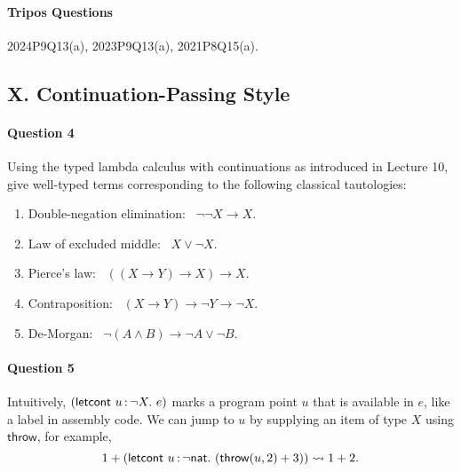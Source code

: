 \documentclass[11pt,a4paper,twoside]{article}
\begin{document}
\paragraph{Tripos Questions} 2024P9Q13(a), 2023P9Q13(a), 2021P8Q15(a).

\subsection*{X. Continuation-Passing Style}

\paragraph{Question 4} Using the typed lambda calculus with continuations as introduced in Lecture 10,
give well-typed terms corresponding to the following classical tautologies:

\begin{enumerate}[label=(\alph*)]
  \item Double-negation elimination: \ $\neg\neg X \to X$.

  \item Law of excluded middle: \ $X \lor \neg X$.   

  \item Pierce's law: \ $((X \to Y) \to X) \to X$.

  \item Contraposition: \ $(X \to Y) \to \neg Y \to \neg X$.

  \item De-Morgan: \ $\neg(A \land B) \to \neg A \lor \neg B$.
\end{enumerate}

\paragraph{Question 5} 
Intuitively, $(\mathsf{letcont}\ \var{u}{\neg X}.\ e)$ marks a program point $u$ that is available in $e$,
like a label in assembly code.
We can jump to $u$ by supplying an item of type $X$ using $\mathsf{throw}$, for example,
  \[ 
    1 + (\mathsf{letcont}\ \var{u}{\neg \mathsf{nat}}.\ (\mathsf{throw}(u, 2) + 3))
      \rightsquigarrow
    1 + 2.
  \]
  
\end{document}
